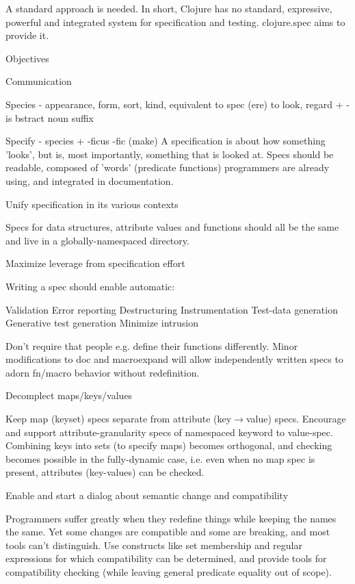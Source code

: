 A standard approach is needed. In short, Clojure has no standard, expressive,
powerful and integrated system for specification and testing. clojure.spec aims
to provide it.

Objectives

Communication

Species - appearance, form, sort, kind, equivalent to spec (ere) to look, regard
               + -is bstract noun suffix

Specify - species + -ficus -fic (make)
A specification is about how something 'looks', but is, most importantly, something that is looked at. Specs should be readable, composed of 'words' (predicate functions) programmers are already using, and integrated in documentation.

Unify specification in its various contexts

Specs for data structures, attribute values and functions should all be the same and live in a globally-namespaced directory.

Maximize leverage from specification effort

Writing a spec should enable automatic:

Validation
Error reporting
Destructuring
Instrumentation
Test-data generation
Generative test generation
Minimize intrusion

Don’t require that people e.g. define their functions differently. Minor modifications to doc and macroexpand will allow independently written specs to adorn fn/macro behavior without redefinition.

Decomplect maps/keys/values

Keep map (keyset) specs separate from attribute (key$\rightarrow$value) specs. Encourage and support attribute-granularity specs of namespaced keyword to value-spec. Combining keys into sets (to specify maps) becomes orthogonal, and checking becomes possible in the fully-dynamic case, i.e. even when no map spec is present, attributes (key-values) can be checked.

Enable and start a dialog about semantic change and compatibility

Programmers suffer greatly when they redefine things while keeping the names the same. Yet some changes are compatible and some are breaking, and most tools can’t distinguish. Use constructs like set membership and regular expressions for which compatibility can be determined, and provide tools for compatibility checking (while leaving general predicate equality out of scope).

